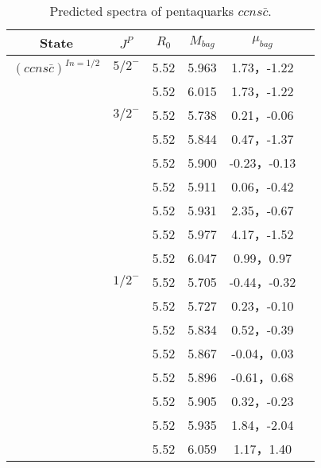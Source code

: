 \documentclass[prd,twocolumn,floatfix,nofootinbib]{revtex4}
\begin{document}
\begin{table*}[!htbp]
    \caption{Predicted spectra of pentaquarks $ccns\bar{c}$.}
    \begin{tabular}{cccccc}
        \hline\hline
        {\rm State} &$J^{P}$ &$R_{0}$ &$M_{bag}$ &$\mu_{bag}$  \\ \hline
      ${(ccns\bar{c})}^{I{n}=1/2}$
            &${5/2}^{-}$     &5.52   &5.963 &1.73，-1.22  \\
                         &$ $     &5.52   &6.015 &1.73，-1.22  \\
            &${3/2}^{-}$     &5.52   &5.738 &0.21，-0.06 \\
                         &$ $     &5.52   &5.844 &0.47，-1.37  \\
                         &$ $     &5.52   &5.900 &-0.23，-0.13  \\
                         &$ $     &5.52   &5.911 &0.06，-0.42 \\
                         &$ $     &5.52   &5.931 &2.35，-0.67  \\
                         &$ $     &5.52   &5.977 &4.17，-1.52  \\
                         &$ $     &5.52   &6.047 &0.99，0.97 \\
            &${1/2}^{-}$     &5.52   &5.705 &-0.44，-0.32  \\
                         &$ $     &5.52   &5.727 &0.23，-0.10  \\
                         &$ $     &5.52   &5.834 &0.52，-0.39  \\
                         &$ $     &5.52   &5.867 &-0.04，0.03 \\
                         &$ $     &5.52   &5.896 &-0.61，0.68 \\
                         &$ $     &5.52   &5.905 &0.32，-0.23  \\
                         &$ $     &5.52   &5.935 &1.84，-2.04 \\
                         &$ $     &5.52   &6.059 &1.17，1.40  \\
        \hline\hline
    \end{tabular}
\end{table*}
\end{document}
